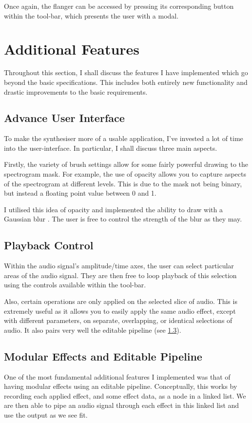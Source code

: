 \documentclass{coursework}
\begin{document}
				Once again, the flanger can be accessed by pressing its corresponding button within the tool-bar, which presents the user with a modal.

	\section{Additional Features}
		Throughout this section, I shall discuss the features I have implemented which go beyond the basic specifications. This includes both entirely new functionality and drastic improvements to the basic requirements.

		\subsection{Advance User Interface}
			To make the synthesiser more of a usable application, I've invested a lot of time into the user-interface. In particular, I shall discuss three main aspects.
			
			Firstly, the variety of brush settings allow for some fairly powerful drawing to the spectrogram mask. For example, the use of opacity allows you to capture aspects of the spectrogram at different levels. This is due to the mask not being binary, but instead a floating point value between 0 and 1.
			
			I utilised this idea of opacity and implemented the ability to draw with a Gaussian blur \parencite{matlabGaussianBlur}. The user is free to control the strength of the blur as they may.
			
		\subsection{Playback Control} \label{ss:playbackcontrol}
			Within the audio signal's amplitude/time axes, the user can select particular areas of the audio signal. They are then free to loop playback of this selection using the controls available within the tool-bar.
			
			Also, certain operations are only applied on the selected slice of audio. This is extremely useful as it allows you to easily apply the same audio effect, except with different parameters, on separate, overlapping, or identical selections of audio. It also pairs very well the editable pipeline (see \ref{ss:pipeline}).
			    
		\subsection{Modular Effects and Editable Pipeline} \label{ss:pipeline}
			One of the most fundamental additional features I implemented was that of having modular effects using an editable pipeline. Conceptually, this works by recording each applied effect, and some effect data, as a node in a linked list. We are then able to pipe an audio signal through each effect in this linked list and use the output as we see fit.
			
\end{document}
